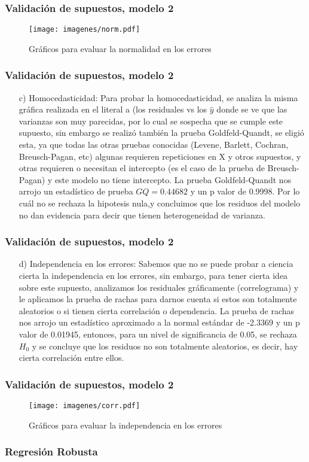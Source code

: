 \documentclass[12pt]{beamer}
\begin{document}
\begin{frame}
\frametitle{Validación de supuestos, modelo 2}
\begin{figure}[h]
  \centering
  \texttt{[image: imagenes/norm.pdf]}
  \caption{Gráficos para evaluar la normalidad en los errores}\label{figura1}
\end{figure}
\end{frame}

\begin{frame}
\frametitle{Validación de supuestos, modelo 2}
\begin{itemize}
\item[c)] Homocedasticidad: Para probar la homocedasticidad, se analiza la misma gráfica realizada en el literal a (los residuales vs los $\hat{y}$ donde se ve que las varianzas son muy parecidas, por lo cual se sospecha que se cumple este supuesto, sin embargo se realizó también la prueba Goldfeld-Quandt, se eligió esta, ya que todas las otras pruebas conocidas (Levene, Barlett, Cochran, Breusch-Pagan, etc) algunas requieren repeticiones en X y otros supuestos, y otras requieren o necesitan el intercepto (es el caso de la prueba de Breusch-Pagan) y este modelo no tiene intercepto. La prueba Goldfeld-Quandt nos arrojo un estadístico de prueba $GQ = 0.44682$ y un p valor de 0.9998. Por lo cuál no se rechaza la hipotesis nula,y concluimos que los residuos del modelo no dan evidencia para decir que tienen heterogeneidad de varianza.
\end{itemize}
\end{frame}

\begin{frame}
\frametitle{Validación de supuestos, modelo 2}
\begin{itemize}
\item[d)] Independencia en los errores: Sabemos que no se puede probar a ciencia cierta la independencia en los errores, sin embargo, para tener cierta idea sobre este supuesto, analizamos los residuales gráficamente (correlograma) y le aplicamos la prueba de rachas para darnos cuenta si estos son totalmente aleatorios o si tienen cierta correlación o dependencia. La prueba de rachas nos arrojo un estadístico aproximado a la normal estándar de -2.3369 y un p valor de 0.01945, entonces, para un nivel de significancia de 0.05, se rechaza $H_{0}$ y se concluye que los residuos no son totalmente aleatorios, es decir, hay cierta correlación entre ellos.
\end{itemize}
\end{frame}

\begin{frame}
\frametitle{Validación de supuestos, modelo 2}
\begin{figure}[h]
  \centering
  \texttt{[image: imagenes/corr.pdf]}
  \caption{Gráficos para evaluar la independencia en los errores}\label{figura1}
\end{figure}
\end{frame}

\begin{frame}
\frametitle{Regresión Robusta}
\end{frame}
\end{document}
